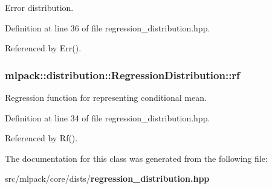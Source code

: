 Error distribution. 



Definition at line 36 of file regression\+\_\+distribution.\+hpp.



Referenced by Err().

\subsubsection[{rf}]{ mlpack\+::distribution\+::\+Regression\+Distribution\+::rf\hspace{0.3cm}{\ttfamily [private]}}\label{classmlpack_1_1distribution_1_1RegressionDistribution_ad8b0c4f275bae93da112cc899be046c3}


Regression function for representing conditional mean. 



Definition at line 34 of file regression\+\_\+distribution.\+hpp.



Referenced by Rf().



The documentation for this class was generated from the following file\+:\begin{DoxyCompactItemize}
\item 
src/mlpack/core/dists/{\bf regression\+\_\+distribution.\+hpp}\end{DoxyCompactItemize}
